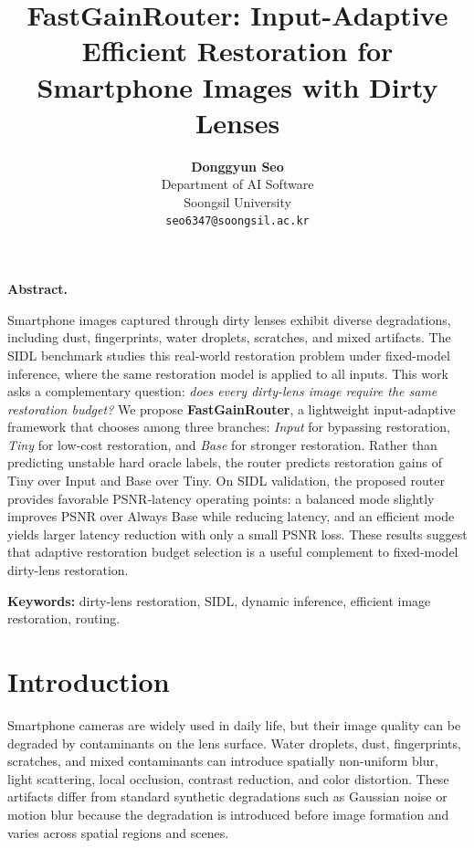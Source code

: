 \documentclass[11pt]{article}
\title{\vspace{-1.0em}
FastGainRouter: Input-Adaptive Efficient Restoration for Smartphone Images with Dirty Lenses
\vspace{-0.4em}
}
\author{
\textbf{Donggyun Seo}\\
Department of AI Software\\
Soongsil University\\
\texttt{seo6347@soongsil.ac.kr}
}
\date{\vspace{-0.8em}}
\renewenvironment{abstract}{
    \vspace{-0.4em}
    \noindent\textbf{Abstract.}\quad
}{
    \par\vspace{0.7em}
}
\begin{document}
\maketitle

\begin{abstract}
Smartphone images captured through dirty lenses exhibit diverse degradations, including dust, fingerprints, water droplets, scratches, and mixed artifacts.
The SIDL benchmark studies this real-world restoration problem under fixed-model inference, where the same restoration model is applied to all inputs.
This work asks a complementary question: \emph{does every dirty-lens image require the same restoration budget?}
We propose \textbf{FastGainRouter}, a lightweight input-adaptive framework that chooses among three branches: \textit{Input} for bypassing restoration, \textit{Tiny} for low-cost restoration, and \textit{Base} for stronger restoration.
Rather than predicting unstable hard oracle labels, the router predicts restoration gains of Tiny over Input and Base over Tiny.
On SIDL validation, the proposed router provides favorable PSNR-latency operating points: a balanced mode slightly improves PSNR over Always Base while reducing latency, and an efficient mode yields larger latency reduction with only a small PSNR loss.
These results suggest that adaptive restoration budget selection is a useful complement to fixed-model dirty-lens restoration.
\end{abstract}

\textbf{Keywords:} dirty-lens restoration, SIDL, dynamic inference, efficient image restoration, routing.

\section{Introduction}

Smartphone cameras are widely used in daily life, but their image quality can be degraded by contaminants on the lens surface.
Water droplets, dust, fingerprints, scratches, and mixed contaminants can introduce spatially non-uniform blur, light scattering, local occlusion, contrast reduction, and color distortion.
These artifacts differ from standard synthetic degradations such as Gaussian noise or motion blur because the degradation is introduced before image formation and varies across spatial regions and scenes.
\end{document}
